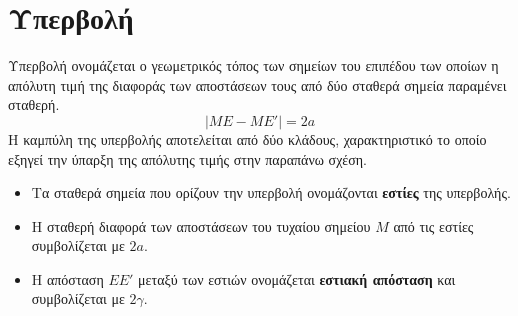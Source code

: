 \section{Υπερβολή}
\orismoi
{} Υπερβολή ονομάζεται ο γεωμετρικός τόπος των σημείων του επιπέδου των οποίων η απόλυτη τιμή της διαφοράς των αποστάσεων τους από δύο σταθερά σημεία παραμένει σταθερή.
\[ |ME-ME'|=2a \]
Η καμπύλη της υπερβολής αποτελείται από δύο κλάδους, χαρακτηριστικό το οποίο εξηγεί την ύπαρξη της απόλυτης τιμής στην παραπάνω σχέση.
\begin{itemize}
\item Τα σταθερά σημεία που ορίζουν την υπερβολή ονομάζονται \textbf{εστίες} της υπερβολής.
\item Η σταθερή διαφορά των αποστάσεων του τυχαίου σημείου $ M $ από τις εστίες συμβολίζεται με $ 2a $.
\item Η απόσταση $ EE' $ μεταξύ των εστιών ονομάζεται \textbf{εστιακή απόσταση} και συμβολίζεται με $ 2\gamma $.
\end{itemize}
